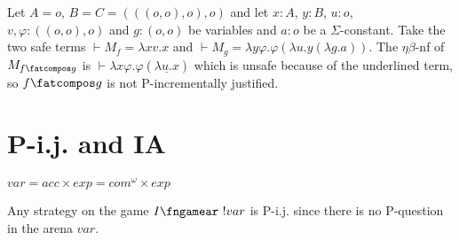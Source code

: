 Let $A=o$, $B=C=(((o,o),o),o)$ and let $x:A$, $y:B$, $u:o$, $v,\varphi:((o,o),o)$
and $g:(o,o)$ be variables and  $a:o$ be a $\Sigma$-constant. Take the two safe terms $\vdash  M_f = \lambda x v.x$ and $\vdash M_g = \lambda y \varphi. \varphi (\lambda u . y (\lambda g. a))$.
The $\eta\beta$-nf of $M_{f\fatcompos g}$ is $\vdash \lambda x \varphi. \varphi (\underline{\lambda u . x})$ which is unsafe because of the underlined term, so
$f\fatcompos g$ is not P-incrementally justified.





\section{P-i.j. and IA}
$var = acc \times exp = com^{\omega}\times exp$

Any strategy on the game $I \fngamear\ !var$ is P-i.j. since there is no P-question in the arena $var$.



